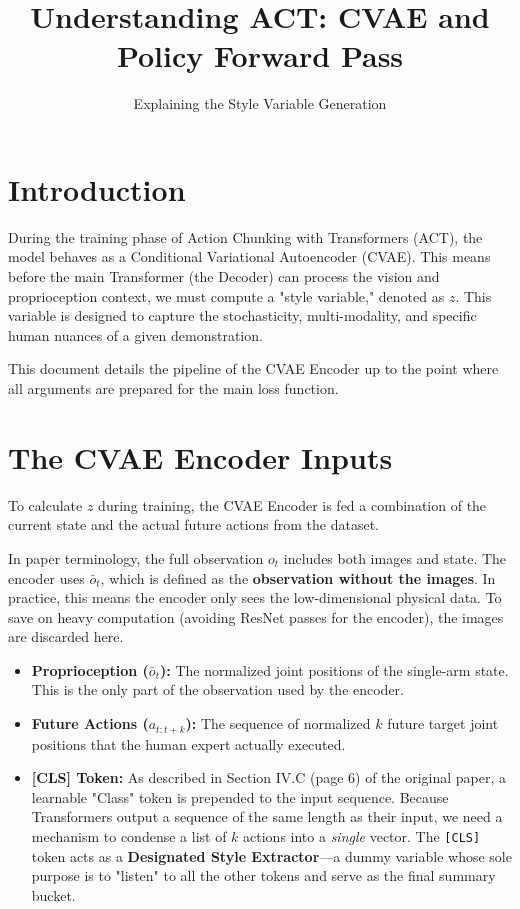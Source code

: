 \documentclass[11pt,a4paper]{article}
\title{\textbf{Understanding ACT: CVAE and Policy Forward Pass}}
\author{Explaining the Style Variable Generation}
\date{\vspace{-5ex}}
\begin{document}
\maketitle

\section{Introduction}
During the training phase of Action Chunking with Transformers (ACT), the model behaves as a Conditional Variational Autoencoder (CVAE). This means before the main Transformer (the Decoder) can process the vision and proprioception context, we must compute a "style variable," denoted as $z$. This variable is designed to capture the stochasticity, multi-modality, and specific human nuances of a given demonstration. 

This document details the pipeline of the CVAE Encoder up to the point where all arguments are prepared for the main loss function.

\section{The CVAE Encoder Inputs}
To calculate $z$ during training, the CVAE Encoder is fed a combination of the current state and the actual future actions from the dataset. 

In paper terminology, the full observation $o_t$ includes both images and state. The encoder uses $\bar{o}_t$, which is defined as the \textbf{observation without the images}. In practice, this means the encoder only sees the low-dimensional physical data. To save on heavy computation (avoiding ResNet passes for the encoder), the images are discarded here.

\begin{itemize}
    \item \textbf{Proprioception ($\bar{o}_{t}$):} The normalized joint positions of the single-arm state. This is the only part of the observation used by the encoder.
    \item \textbf{Future Actions ($a_{t:t+k}$):} The sequence of normalized $k$ future target joint positions that the human expert actually executed.
    \item \textbf{[CLS] Token:} As described in Section IV.C (page 6) of the original paper, a learnable "Class" token is prepended to the input sequence. Because Transformers output a sequence of the same length as their input, we need a mechanism to condense a list of $k$ actions into a \textit{single} vector. The \texttt{[CLS]} token acts as a \textbf{Designated Style Extractor}---a dummy variable whose sole purpose is to "listen" to all the other tokens and serve as the final summary bucket.
\end{itemize}
\end{document}
